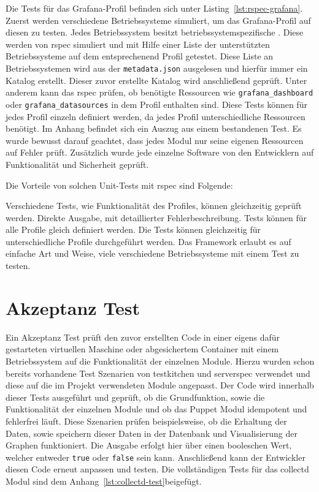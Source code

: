 Die Tests für das Grafana-Profil befinden sich unter
Listing~\ref{lst:rspec-grafana}.  Zuerst werden verschiedene Betriebssysteme
simuliert, um das Grafana-Profil auf diesen zu testen. Jedes Betriebssystem
besitzt betriebssystemspezifische . Diese werden von rspec
simuliert und mit Hilfe einer Liste der unterstützten Betriebssysteme auf dem
entsprechenend Profil getestet. Diese Liste an Betriebssystemen wird aus der
\texttt{metadata.json} ausgelesen und hierfür immer ein Katalog erstellt.
Dieser zuvor erstellte Katalog wird anschließend geprüft. Unter anderem kann
das rspec prüfen, ob benötigte Ressourcen wie \texttt{grafana\_dashboard} oder
\texttt{grafana\_datasources} in dem Profil enthalten sind. Diese Tests können
für jedes Profil einzeln definiert werden, da jedes Profil unterschiedliche
Ressourcen benötigt. Im Anhang befindet sich ein Auszug aus einem bestandenen
Test. Es wurde bewusst darauf geachtet, dass jedes Modul nur seine eigenen
Ressourcen auf Fehler prüft. Zusätzlich wurde jede einzelne Software von den
Entwicklern auf Funktionalität und Sicherheit geprüft.

Die Vorteile von solchen Unit-Tests mit rspec sind Folgende:

\begin{outline}
  \1 Verschiedene Tests, wie Funktionalität des Profiles, können gleichzeitig
  geprüft werden.
  \1 Direkte Ausgabe, mit detaillierter Fehlerbeschreibung.
  \1 Tests können für alle Profile gleich definiert werden.
  \1 Die Tests können gleichzeitig für unterschiedliche Profile durchgeführt
  werden.
  \1 Das Framework erlaubt es auf einfache Art und Weise, viele verschiedene
  Betriebssysteme mit einem Test zu testen.
\end{outline}
\mr%

\section{Akzeptanz Test}
Ein Akzeptanz Test prüft den zuvor erstellten Code in einer eigens dafür
gestarteten virtuellen Maschine oder abgesichertem Container mit einem
Betriebssystem auf die Funktionalität der einzelnen Module. Hierzu wurden schon
bereits vorhandene Test Szenarien von \gls{testkitchen} und \gls{serverspec}
verwendet und diese auf die im Projekt verwendeten Module angepasst. Der Code
wird innerhalb dieser Tests ausgeführt und geprüft, ob die Grundfunktion, sowie
die Funktionalität der einzelnen Module und ob das Puppet Modul idempotent und
fehlerfrei läuft. Diese Szenarien prüfen beispielsweise, ob die Erhaltung der
Daten, sowie speichern dieser Daten in der Datenbank und Visualisierung der
Graphen funktioniert. Die Ausgabe erfolgt hier über einen booleschen Wert,
welcher entweder \texttt{true} oder \texttt{false} sein kann. Anschließend
kann der Entwickler diesen Code erneut anpassen und testen. Die vollständigen
Tests für das collectd Modul sind dem Anhang~\ref{lst:collectd-test}beigefügt.

